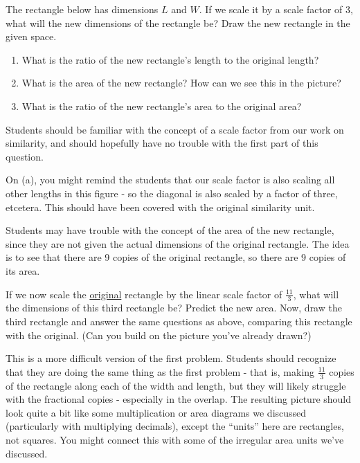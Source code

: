 \documentclass[nooutcomes]{ximera}
\begin{document}
\begin{problem}
The rectangle below has dimensions $L$ and $W$. If we scale it by a scale factor of 3, what will the new dimensions of the rectangle be? Draw the new rectangle in the given space.\\

 \hspace{4cm}
\vskip 2.5in

\begin{enumerate}
    \item What is the ratio of the new rectangle's length to the original  length?
    \item What is the area of the new rectangle?  How can we see this in the picture?
    \item What is the ratio of the new rectangle's area to the original area?
\end{enumerate}

\begin{instructorNotes}
Students should be familiar with the concept of a scale factor from our work on similarity, and should hopefully have no trouble with the first part of this question.

On (a), you might remind the students that our scale factor is also scaling all other lengths in this figure - so the diagonal is also scaled by a factor of three, etcetera.  This should have been covered with the original similarity unit.

Students may have trouble with the concept of the area of the new rectangle, since they are not given the actual dimensions of the original rectangle.  The idea is to see that there are 9 copies of the original rectangle, so there are 9 copies of its area.
\end{instructorNotes}
\end{problem}

\begin{problem}
If we now scale the \underline{original} rectangle by the linear scale factor of $\frac{11}{3}$, what will the dimensions of this third rectangle be?  Predict the new area.  Now, draw the third rectangle and answer the same questions as above, comparing this rectangle with the original. (Can you build on the picture you've already drawn?)

\begin{instructorNotes}
This is a more difficult version of the first problem.  Students should recognize that they are doing the same thing as the first problem - that is, making $\frac{11}{3}$ copies of the rectangle along each of the width and length, but they will likely struggle with the fractional copies - especially in the overlap.  The resulting picture should look quite a bit like some multiplication or area diagrams we discussed (particularly with multiplying decimals), except the ``units'' here are rectangles, not squares.  You might connect this with some of the irregular area units we've discussed.
\end{instructorNotes}

\end{problem}
\end{document}
